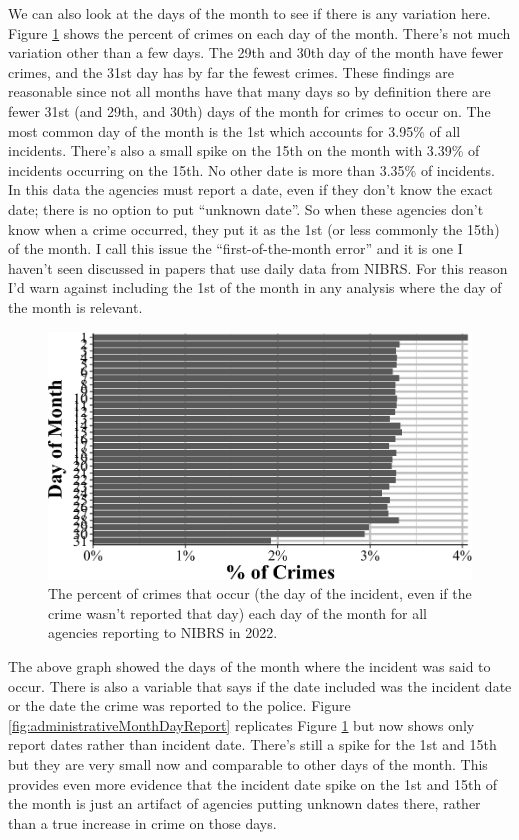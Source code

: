 \documentclass[
  12pt,
  openany]{book}
\begin{document}
We can also look at the days of the month to see if there is any variation here. Figure \ref{fig:administrativeMonthDayIncident} shows the percent of crimes on each day of the month. There's not much variation other than a few days. The 29th and 30th day of the month have fewer crimes, and the 31st day has by far the fewest crimes. These findings are reasonable since not all months have that many days so by definition there are fewer 31st (and 29th, and 30th) days of the month for crimes to occur on. The most common day of the month is the 1st which accounts for 3.95\% of all incidents. There's also a small spike on the 15th on the month with 3.39\% of incidents occurring on the 15th. No other date is more than 3.35\% of incidents. In this data the agencies must report a date, even if they don't know the exact date; there is no option to put ``unknown date''. So when these agencies don't know when a crime occurred, they put it as the 1st (or less commonly the 15th) of the month. I call this issue the ``first-of-the-month error'' and it is one I haven't seen discussed in papers that use daily data from NIBRS. For this reason I'd warn against including the 1st of the month in any analysis where the day of the month is relevant.

\begin{figure}

{\centering \includegraphics[width=0.9\linewidth]{12_nibrs_administrative_files/figure-latex/administrativeMonthDayIncident-1} 

}

\caption{The percent of crimes that occur (the day of the incident, even if the crime wasn't reported that day) each day of the month for all agencies reporting to NIBRS in 2022.}\label{fig:administrativeMonthDayIncident}
\end{figure}

The above graph showed the days of the month where the incident was said to occur. There is also a variable that says if the date included was the incident date or the date the crime was reported to the police. Figure \ref{fig:administrativeMonthDayReport} replicates Figure \ref{fig:administrativeMonthDayIncident} but now shows only report dates rather than incident date. There's still a spike for the 1st and 15th but they are very small now and comparable to other days of the month. This provides even more evidence that the incident date spike on the 1st and 15th of the month is just an artifact of agencies putting unknown dates there, rather than a true increase in crime on those days.
\end{document}
